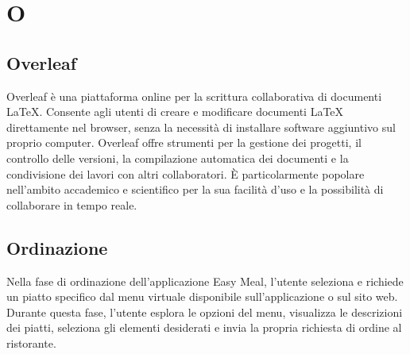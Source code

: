 \section*{O} 
\subsection*{Overleaf} 
Overleaf è una piattaforma online per la scrittura collaborativa di documenti LaTeX. Consente agli utenti di creare e modificare documenti LaTeX direttamente nel browser, senza la necessità di installare software aggiuntivo sul proprio computer. Overleaf offre strumenti per la gestione dei progetti, il controllo delle versioni, la compilazione automatica dei documenti e la condivisione dei lavori con altri collaboratori. È particolarmente popolare nell'ambito accademico e scientifico per la sua facilità d'uso e la possibilità di collaborare in tempo reale. 
\subsection*{Ordinazione} 
Nella fase di ordinazione dell'applicazione Easy Meal, l'utente seleziona e richiede un piatto specifico dal menu virtuale disponibile sull'applicazione o sul sito web. Durante questa fase, l'utente esplora le opzioni del menu, visualizza le descrizioni dei piatti, seleziona gli elementi desiderati e invia la propria richiesta di ordine al ristorante. 
